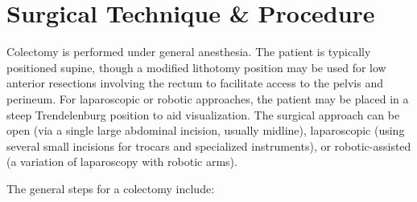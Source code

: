 \section*{Surgical Technique \& Procedure}
Colectomy is performed under general anesthesia. The patient is typically positioned supine, though a modified lithotomy position may be used for low anterior resections involving the rectum to facilitate access to the pelvis and perineum. For laparoscopic or robotic approaches, the patient may be placed in a steep Trendelenburg position to aid visualization. The surgical approach can be open (via a single large abdominal incision, usually midline), laparoscopic (using several small incisions for trocars and specialized instruments), or robotic-assisted (a variation of laparoscopy with robotic arms).

The general steps for a colectomy include:
